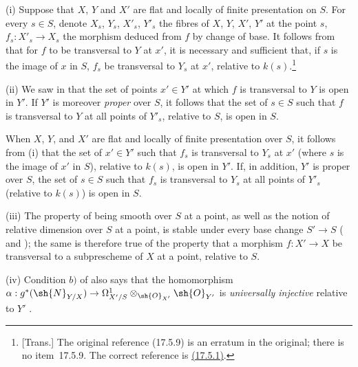 \begin{remarks}[17.13.4]
\label{IV.17.13.4}
(i)
Suppose that $X$, $Y$ and $X'$ are flat and locally of finite presentation on $S$.
For every $s\in S$, denote $X_s$, $Y_s$, $X'_s$, $Y'_s$ the fibres of $X$, $Y$, $X'$, $Y'$ at the point $s$, $f_s:X'_s\to X_s$ the morphism deduced from $f$ by change of base.
It follows from  that for $f$ to be transversal to $Y$ at $x'$, it is necessary and sufficient that, if $s$ is the image of $x$ in $S$, $f_s$ be transversal to $Y_s$ at $x'$, relative to $k(s)$.\footnote{[Trans.] The original reference (17.5.9) is an erratum in the original; there is no item~17.5.9. The correct reference is {\hyperlink{ega4.c04.thm.17-5-1}{(17.5.1)}}.}

(ii)
We saw in  that the set of points $x'\in Y'$ at which $f$ is transversal to $Y$ is open in $Y'$.
If $Y'$ is moreover \emph{proper} over $S$, it follows that the set of $s\in S$ such that $f$ is transversal to $Y$ at all points of $Y'_s$, relative to $S$, is open in $S$.

When $X$, $Y$, and $X'$ are flat and locally of finite presentation over $S$, it follows from (i) that the set of $x'\in Y'$ such that $f_s$ is transversal to $Y_s$ at $x'$ (where $s$ is the image of $x'$ in $S$), relative to $k(s)$, is open in $Y'$.
If, in addition, $Y'$ is proper over $S$, the set of $s\in S$ such that $f_s$ is transversal to $Y_s$ at all points of $Y'_s$ (relative to $k(s)$) is open in $S$.

(iii)
The property of being smooth over $S$ at a point, as well as the notion of relative dimension over $S$ at a point, is stable under every base change $S'\to S$ ( and ); the same is therefore true of the property that a morphism $f:X'\to X$ be transversal to a subprescheme of $X$ at a point, relative to $S$.


(iv)
Condition $b)$ of  also says that the homomorphism
$\alpha:g^*(\sh{N}_{Y/X})\to\Omega^1_{X'/S}\otimes_{\sh{O}_{X'}}\sh{O}_{Y'}$
is \emph{universally injective} relative to $Y'$ .
\end{remarks}

